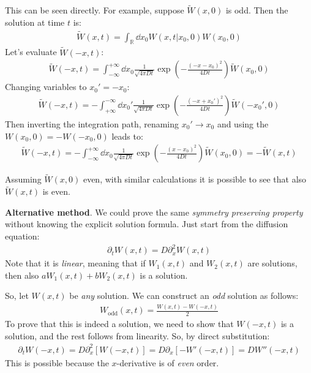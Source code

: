 \documentclass[../template.tex]{subfiles}
\begin{document}
\begin{exo}
    This can be seen directly. For example, suppose $\tilde{W}(x,0)$ is odd. Then the solution at time $t$ is:
    \begin{align*}
        \tilde{W}(x,t) = \int_{\mathbb{R}} \dd{x_0} W(x,t|x_0,0) W(x_0,0)
    \end{align*}
    Let's evaluate $\tilde{W}(-x,t)$:
    \begin{align*}
        \tilde{W}(-x,t) = \int_{-\infty}^{+\infty} \dd{x_0} \frac{1}{\sqrt{4 \pi Dt}}  \exp\left(-\frac{(-x -x_0)^2}{4Dt} \right) \tilde{W}(x_0,0)
    \end{align*}
    Changing variables to $x_0' = -x_0$:
    \begin{align*}
        \tilde{W}(-x,t) = -\int_{+\infty}^{-\infty} \dd{x_0'} \frac{1}{\sqrt{4 \pi Dt}}  \exp\left(-\frac{(-x +x_0')^2}{4Dt} \right) \tilde{W}(-x_0',0)
    \end{align*}
    Then inverting the integration path, renaming $x_0' \to x_0$ and using the $W(x_0,0) = -W(-x_0,0)$ leads to:
    \begin{align*}
        \tilde{W}(-x,t) = -\int_{-\infty}^{+\infty} \dd{x_0} \frac{1}{\sqrt{4 \pi Dt}} \exp\left(-\frac{(x-x_0)^2}{4Dt} \right) \tilde{W}(x_0,0) = - \tilde{W}(x,t)
    \end{align*} 
    
    Assuming $\tilde{W}(x,0)$ even, with similar calculations it is possible to see that also $\tilde{W}(x,t)$ is even.

    \begin{expl}
        \textbf{Alternative method}. We could prove the same \textit{symmetry preserving property} without knowing the explicit solution formula. Just start from the diffusion equation:
        \begin{align} \label{eqn:d1}
            \partial_t W(x,t) = D\partial_x^2 W(x,t)
        \end{align}  
        Note that it is \textit{linear}, meaning that if $W_1(x,t)$ and $W_2(x,t)$ are solutions, then also $a W_1(x,t) + bW_2(x,t)$ is a solution.

        So, let $W(x,t)$ be \textit{any} solution. We can construct an \textit{odd} solution as follows:
        \begin{align*}
            W_{\mathrm{odd}}(x,t) = \frac{W(x,t) - W(-x,t)}{2} 
        \end{align*}  
        To prove that this is indeed a solution, we need to show that $W(-x,t)$ is a solution, and the rest follows from linearity. So, by direct substitution:
        \begin{align*}
            \partial_t W(-x,t) = D \partial_x^2 [W(-x,t)] = D \partial_x[-W'(-x,t)] = D W''(-x,t)
        \end{align*}
        This is possible because the $x$-derivative is of \textit{even} order. 
    \end{expl}


\end{exo}
\end{document}
